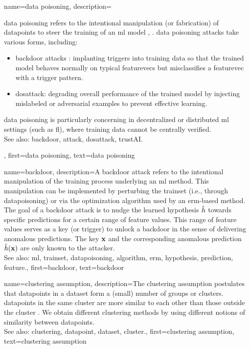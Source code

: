 {name={data poisoning}, 
  description={\Gls{data} poisoning refers to the intentional manipulation 
  	(or fabrication) of \glspl{datapoint} to steer the training of an \gls{ml} \gls{model} \cite{Liu2021}, \cite{PoisonGAN}. 
  	\Gls{data} poisoning \glspl{attack} take various forms, including:
  	\begin{itemize}
  		\item \Gls{backdoor} \glspl{attack} : implanting triggers into training \gls{data} so that the trained \gls{model} 
  		behaves normally on typical \glspl{featurevec} but misclassifies a \gls{featurevec} with a trigger pattern.
  		\item \gls{dosattack}: degrading overall performance of the trained \gls{model} by injecting mislabeled or 
  		adversarial examples to prevent effective learning.
  	\end{itemize}
	\Gls{data} poisoning is particularly concerning in decentralized or distributed \gls{ml} settings (such as \gls{fl}), 
	where training \gls{data} cannot be centrally verified.
				\\
		See also: \gls{backdoor}, \gls{attack}, \gls{dosattack}, \gls{trustAI}.},
	first={data poisoning},
	text={data poisoning} 
}
	
	
{name={backdoor}, 
	description={A backdoor attack refers 
		to the intentional manipulation of the training process underlying an \gls{ml} method. This manipulation 
		can be implemented by perturbing the \gls{trainset} (i.e., through \gls{datapoisoning}) or via the 
		optimization \gls{algorithm} used by an \gls{erm}-based method. The goal of a 
		backdoor attack is to nudge the learned \gls{hypothesis} $\hat{h}$ 
		towards specific \glspl{prediction} for a certain range of \gls{feature} values. This range of \gls{feature} 
		values serves as a key (or trigger) to unlock a backdoor in the sense of 
		delivering anomalous \glspl{prediction}. The key ${\bf x}$ and the corresponding 
		anomalous \gls{prediction} $\hat{h}({\bf x})$ are only known to the attacker.
				\\
		See also: \gls{ml}, \gls{trainset}, \gls{datapoisoning}, \gls{algorithm}, \gls{erm}, \gls{hypothesis}, \gls{prediction}, \gls{feature}.},
	first={backdoor},
	text={backdoor} 
}


{name={clustering assumption}, 
 description={The \gls{clustering} assumption postulates that 
 	\glspl{datapoint} in a \gls{dataset} form a (small) number of groups or \glspl{cluster}. 
 	\Glspl{datapoint} in the same \gls{cluster} are more similar to each 
		other than those outside the \gls{cluster} \cite{SemiSupervisedBook}. We obtain different 
		\gls{clustering} methods by using different notions of similarity between \glspl{datapoint}.
				\\
		See also: \gls{clustering}, \gls{datapoint}, \gls{dataset}, \gls{cluster}.},
		first={clustering assumption},
		text={clustering assumption} }


